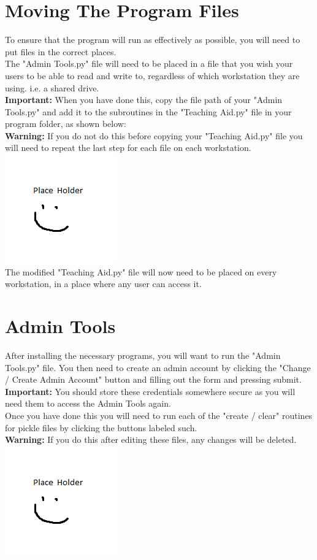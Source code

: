 \documentclass{report}
\begin{document}
\section{Moving The Program Files}
To ensure that the program will run as effectively as possible, you will need to put files in the correct places.\\
The "Admin Tools.py" file will need to be placed in a file that you wish your users to be able to read and write to, regardless of which workstation they are using. i.e. a shared drive.\\ \textbf{Important:} When you have done this, copy the file path of your "Admin Tools.py" and add it to the subroutines in the "Teaching Aid.py" file in your program folder, as shown below:\\
\textbf{Warning: }If you do not do this before copying your "Teaching Aid.py" file you will need to repeat the last step for each file on each workstation.\\
\includegraphics{placeholder}\\

The modified "Teaching Aid.py" file will now need to be placed on every workstation, in a place where any user can access it.
\section{Admin Tools}
After installing the necessary programs, you will want to run the "Admin Tools.py" file. You then need to create an admin account by clicking the "Change / Create Admin Account" button and filling out the form and pressing submit.\\
\textbf{Important: }You should store these credentials somewhere secure as you will need them to access the Admin Tools again.\\
 Once you have done this you will need to run each of the "create / clear" routines for pickle files by clicking the buttons labeled such.\\
\textbf{Warning: }If you do this after editing these files, any changes will be deleted.\\
\includegraphics{placeholder}
\end{document}
